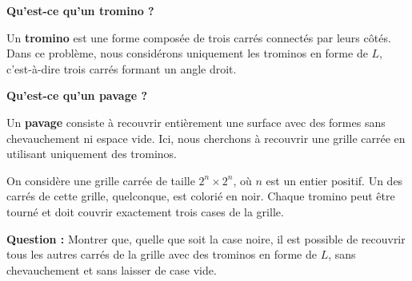 \textbf{Qu'est-ce qu'un tromino ?}

Un \textbf{tromino} est une forme composée de trois carrés connectés par
leurs côtés. Dans ce problème, nous considérons uniquement les trominos en
forme de $L$, c'est-à-dire trois carrés formant un angle droit.

\textbf{Qu'est-ce qu'un pavage ?}

Un \textbf{pavage} consiste à recouvrir entièrement une surface avec des
formes sans chevauchement ni espace vide. Ici, nous cherchons à recouvrir une
grille carrée en utilisant uniquement des trominos.

\begin{center}
\end{center}

On considère une grille carrée de taille $2^n \times 2^n$, où $n$ est un
entier positif. Un des carrés de cette grille, quelconque, est colorié en noir. Chaque tromino
peut être tourné et doit couvrir exactement trois cases de la grille.

\textbf{Question :} Montrer que, quelle que soit la case noire, il est possible de recouvrir tous les autres carrés de la
grille avec des trominos en forme de $L$, sans chevauchement et sans laisser
de case vide.
